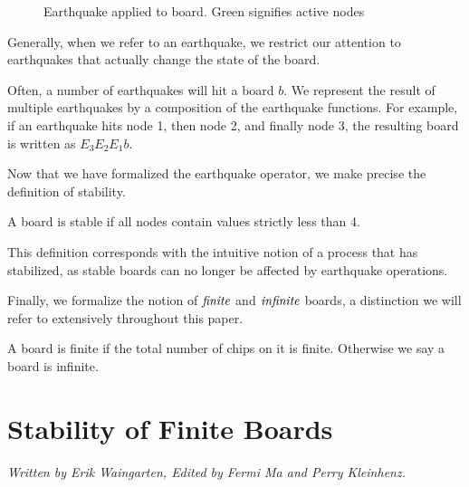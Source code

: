 \documentclass[runningheads,a4paper]{llncs}
\begin{document}
\begin{figure}
\centering
{}
\qquad\qquad
{}
\caption{Earthquake applied to board. Green signifies active nodes}
\label{fig:earthquakeexample}
\end{figure}

Generally, when we refer to an earthquake, we restrict our attention to earthquakes that actually change the state of the board. 

Often, a number of earthquakes will hit a board $b$. We represent the result of multiple earthquakes by a composition of the earthquake functions. For example, if an earthquake hits node 1, then node 2, and finally node 3, the resulting board is written as $E_3E_2E_1b$.

Now that we have formalized the earthquake operator, we make precise the definition of stability.
\begin{definition}
A board is stable if all nodes contain values strictly less than 4. 
\end{definition}
This definition corresponds with the intuitive notion of a process that has stabilized, as stable boards can no longer be affected by earthquake operations.

Finally, we formalize the notion of $\emph{finite}$ and $\emph{infinite}$ boards, a distinction we will refer to extensively throughout this paper.

\begin{definition} 
A board is finite if the total number of chips on it is finite. Otherwise we say a board is infinite. 
\end{definition}

\section{Stability of Finite Boards}
\label{Stability of Finite Boards}
\emph{Written by Erik Waingarten, Edited by Fermi Ma and Perry Kleinhenz.}
\end{document}
